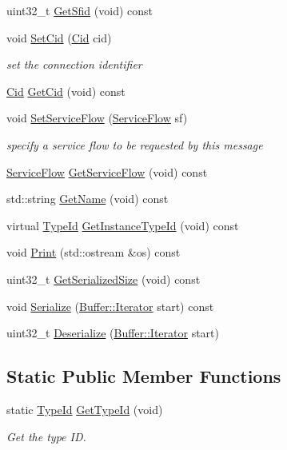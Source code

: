 \begin{DoxyCompactItemize}
uint32\+\_\+t \hyperlink{classns3_1_1DsaRsp_a884f01095ade4f1c45b9fd62b42b79c5}{Get\+Sfid} (void) const 
\item 
void \hyperlink{classns3_1_1DsaRsp_affa0e64b9c1bf2103e60b0d456dfbef7}{Set\+Cid} (\hyperlink{classns3_1_1Cid}{Cid} cid)
\begin{DoxyCompactList}\small\item\em set the connection identifier \end{DoxyCompactList}\item 
\hyperlink{classns3_1_1Cid}{Cid} \hyperlink{classns3_1_1DsaRsp_a03d54ca1e81c05eed9de864285d574db}{Get\+Cid} (void) const 
\item 
void \hyperlink{classns3_1_1DsaRsp_a82dc257a2f78a54705f57aee3267d81f}{Set\+Service\+Flow} (\hyperlink{classns3_1_1ServiceFlow}{Service\+Flow} sf)
\begin{DoxyCompactList}\small\item\em specify a service flow to be requested by this message \end{DoxyCompactList}\item 
\hyperlink{classns3_1_1ServiceFlow}{Service\+Flow} \hyperlink{classns3_1_1DsaRsp_af69ef9dbf3609aab86d47224c4885e23}{Get\+Service\+Flow} (void) const 
\item 
std\+::string \hyperlink{classns3_1_1DsaRsp_a930c55c50235a2581f5bbdb3e66294fe}{Get\+Name} (void) const 
\item 
virtual \hyperlink{classns3_1_1TypeId}{Type\+Id} \hyperlink{classns3_1_1DsaRsp_abd37c929e245d27bbcc17e26aebc2636}{Get\+Instance\+Type\+Id} (void) const 
\item 
void \hyperlink{classns3_1_1DsaRsp_a88207ff11f7b04f673189449d0e1e9b7}{Print} (std\+::ostream \&os) const 
\item 
uint32\+\_\+t \hyperlink{classns3_1_1DsaRsp_a30d4c0301ba3ba58012ef8f66708fefe}{Get\+Serialized\+Size} (void) const 
\item 
void \hyperlink{classns3_1_1DsaRsp_aa05a9da74aa42aab526e95f294754fca}{Serialize} (\hyperlink{classns3_1_1Buffer_1_1Iterator}{Buffer\+::\+Iterator} start) const 
\item 
uint32\+\_\+t \hyperlink{classns3_1_1DsaRsp_a753b7a45c528a85350355733615535e3}{Deserialize} (\hyperlink{classns3_1_1Buffer_1_1Iterator}{Buffer\+::\+Iterator} start)
\end{DoxyCompactItemize}
\subsection*{Static Public Member Functions}
\begin{DoxyCompactItemize}
\item 
static \hyperlink{classns3_1_1TypeId}{Type\+Id} \hyperlink{classns3_1_1DsaRsp_a59346343df47da1f4580ddf2f69c8083}{Get\+Type\+Id} (void)
\begin{DoxyCompactList}\small\item\em Get the type ID. \end{DoxyCompactList}\end{DoxyCompactItemize}
